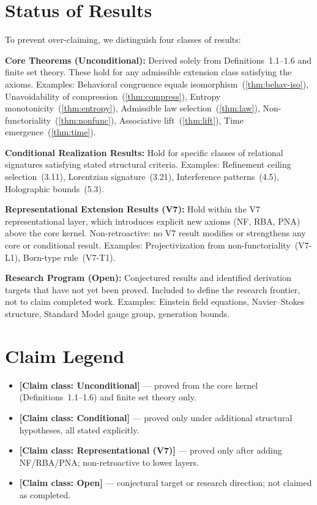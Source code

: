 \documentclass[11pt,a4paper]{article}
\theoremstyle{definition}
\theoremstyle{remark}
\newcommand{\claimtag}[1]{\textcolor{blue!60!black}{\textbf{[Claim class: #1]}}}
\begin{document}
\section*{Status of Results}

To prevent over-claiming, we distinguish four classes of results:

\textbf{Core Theorems (Unconditional):} Derived solely from Definitions~1.1--1.6 and finite set theory. These hold for any admissible extension class satisfying the axioms. Examples: Behavioral congruence equals isomorphism~(\ref{thm:behav-iso}), Unavoidability of compression~(\ref{thm:compress}), Entropy monotonicity~(\ref{thm:entropy}), Admissible law selection~(\ref{thm:law}), Non-functoriality~(\ref{thm:nonfunc}), Associative lift~(\ref{thm:lift}), Time emergence~(\ref{thm:time}).

\textbf{Conditional Realization Results:} Hold for specific classes of relational signatures satisfying stated structural criteria. Examples: Refinement ceiling selection~(3.11), Lorentzian signature~(3.21), Interference patterns~(4.5), Holographic bounds~(5.3).

\textbf{Representational Extension Results (V7):} Hold within the V7 representational layer, which introduces explicit new axioms (NF, RBA, PNA) above the core kernel. Non-retroactive: no V7 result modifies or strengthens any core or conditional result. Examples: Projectivization from non-functoriality~(V7-L1), Born-type rule~(V7-T1).

\textbf{Research Program (Open):} Conjectured results and identified derivation targets that have not yet been proved. Included to define the research frontier, not to claim completed work. Examples: Einstein field equations, Navier--Stokes structure, Standard Model gauge group, generation bounds.

\section*{Claim Legend}
\begin{itemize}[leftmargin=1.5em]
  \item \claimtag{Unconditional} --- proved from the core kernel (Definitions~1.1--1.6) and finite set theory only.
  \item \claimtag{Conditional} --- proved only under additional structural hypotheses, all stated explicitly.
  \item \claimtag{Representational (V7)} --- proved only after adding NF/RBA/PNA; non-retroactive to lower layers.
  \item \claimtag{Open} --- conjectural target or research direction; not claimed as completed.
\end{itemize}
\end{document}
